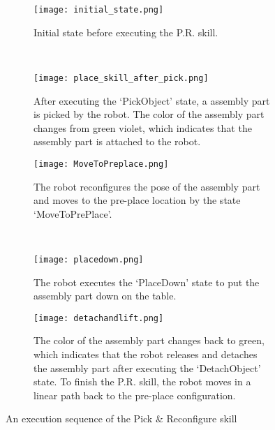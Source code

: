 \begin{figure}[!htbp]
\captionsetup[subfigure]{position=b}
    \centering
    \begin{subfigure}[t]{0.45\textwidth}
        \texttt{[image: initial\_state.png]}
        \caption{Initial state before executing the P.R. skill. }
        \label{fig:place_intial_state}
    \end{subfigure}
    ~
    \begin{subfigure}[t]{0.45\textwidth}
        \texttt{[image: place\_skill\_after\_pick.png]}
        \caption{After executing the `PickObject' state, a assembly part is picked by the robot. The color of the assembly part changes from green violet, which indicates that the assembly part is attached to the robot.}
        \label{fig:place_after_pick}
    \end{subfigure}
    
    \begin{subfigure}[t]{0.45\textwidth}
        \texttt{[image: MoveToPreplace.png]}
        \caption{The robot reconfigures the pose of the assembly part and moves to the pre-place location by  the  state `MoveToPrePlace'.}
        \label{fig:place_move_to_pre_place}
    \end{subfigure}
    ~
    \begin{subfigure}[t]{0.45\textwidth}
        \texttt{[image: placedown.png]}
        \caption{The robot executes the `PlaceDown' state to put the assembly part down on the table.}
        \label{fig:place_placedown}
    \end{subfigure}
      
    \begin{subfigure}[t]{0.45\textwidth}
        \texttt{[image: detachandlift.png]}
        \caption{The color of the assembly part changes back to green, which indicates that the robot releases and detaches the assembly part after executing the `DetachObject' state. To finish the P.R. skill, the robot moves in a linear path back to the pre-place configuration.}
        \label{fig:place_detach_and_lift}
    \end{subfigure}
    \caption{An execution sequence of the Pick \& Reconfigure skill}\label{fig:example_reconfigure}
\end{figure} 


